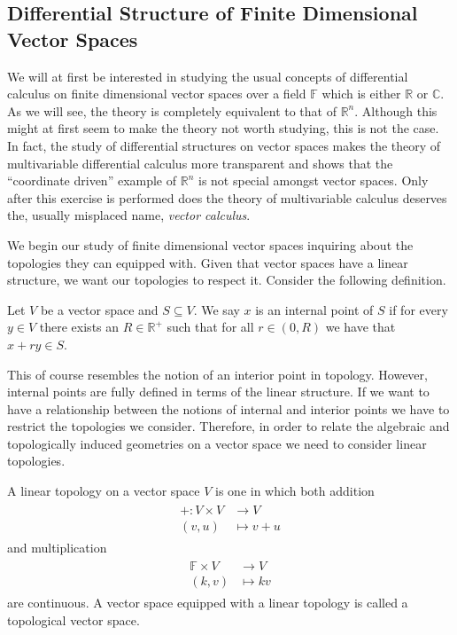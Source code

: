 \subsection{Differential Structure of Finite Dimensional Vector Spaces}

We will at first be interested in studying the usual concepts of differential calculus on finite dimensional vector spaces over a field $\mathbb{F}$ which is either $\mathbb{R}$ or $\mathbb{C}$. As we will see, the theory is completely equivalent to that of $\mathbb{R}^n$. Although this might at first seem to make the theory not worth studying, this is not the case. In fact, the study of differential structures on vector spaces makes the theory of multivariable differential calculus more transparent and shows that the ``coordinate driven'' example of $\mathbb{R}^n$ is not special amongst vector spaces. Only after this exercise is performed does the theory of multivariable calculus deserves the, usually misplaced name, \textit{vector calculus}.

We begin our study of finite dimensional vector spaces inquiring about the topologies they can equipped with. Given that vector spaces have a linear structure, we want our topologies to respect it. Consider the following definition.

\begin{definition}
	Let $V$ be a vector space and $S\subseteq V$. We say $x$ is an internal point of $S$ if for every $y\in V$ there exists an $R\in\mathbb{R}^+$ such that for all $r\in(0,R)$ we have that $x+ry\in S$. 
\end{definition}

This of course resembles the notion of an interior point in topology. However, internal points are fully defined in terms of the linear structure. If we want to have a relationship between the notions of internal and interior points we have to restrict the topologies we consider. Therefore, in order to relate the algebraic and topologically induced geometries on a vector space we need to consider linear topologies.
	
\begin{definition}
	A linear topology on a vector space $V$ is one in which both addition
	\begin{align}
	\begin{split}
		+:V\times V&\rightarrow V\\
		(v,u)&\mapsto v+u
	\end{split}
	\end{align}
and multiplication
	\begin{align}
	\begin{split}
		\mathbb{F}\times V&\rightarrow V\\
		(k,v)&\mapsto kv
	\end{split}
	\end{align}
are continuous. A vector space equipped with a linear topology is called a topological vector space.
\end{definition}

